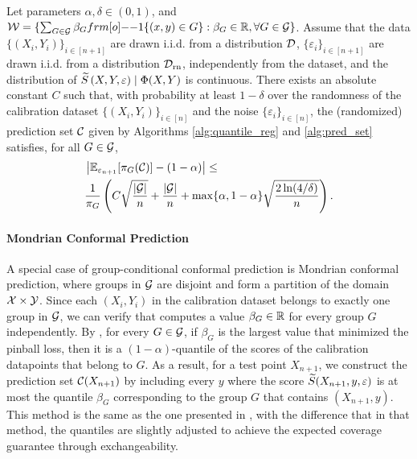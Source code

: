 \begin{corollary}
\label{cor: group-cond}
     Let parameters $\alpha,\delta \in (0,1)$, and $\calW = \{\sum_{G \in \calG} \beta_G \11\{(x,y) \in G\}: \beta_G \in \RR, \forall G \in \calG \}$. Assume that the data $\{(X_i,Y_i)\}_{i\in [n+1]}$ are drawn \mbox{i.i.d.} from a distribution ${\cal D}$, $\{\varepsilon_i\}_{i\in [n+1]}$ are drawn \mbox{i.i.d.} from a distribution ${\cal D}_{\text{rn}}$, independently from the dataset, and the distribution of ${\widetilde{S}}\left(X,Y, \varepsilon\right) \mid \Phi(X,Y)$ is continuous. There exists an absolute constant $C$ such that, with probability at least $1-\delta$ over the randomness of the calibration dataset $\{(X_i,Y_i)\}_{i\in [n]}$ and the noise $\{\varepsilon_i\}_{i \in [n]}$, the (randomized) prediction set ${\cal C}$ given by Algorithms \ref{alg:quantile_reg} and \ref{alg:pred_set} satisfies, for all $G \in {\cal G}$,
    \begin{align*}
    &\left|\mathbb{E}_{\varepsilon_{n+1}}[\pi_{G} ({\cal C})] -(1-\alpha)\right| \leq \\
    &{} 
    \frac{1}{\pi_G}\left( C \sqrt{\frac{|{\cal G}|}{n}} + \frac{|{\cal G}|}{n} +\max \{\alpha, 1-\alpha\}\sqrt{\frac{2\ln(4/\delta)}{n}}  \right).
    \end{align*}
\end{corollary}

\paragraph{Mondrian Conformal Prediction}
A special case of group-conditional conformal prediction is Mondrian conformal prediction, where groups in ${\cal G}$ are disjoint and form a partition of the domain ${\cal X} \times {\cal Y}$. Since each $(X_i, Y_i)$ in the calibration dataset belongs to exactly one group in ${\cal G}$, we can verify that  computes a value $\beta_G \in \mathbb{R}$ for every group $G$ independently. By , for every $G \in {\cal G}$, if $\beta_G$ is the largest value that minimized the pinball loss, then it is a $(1-\alpha)$-quantile of the scores of the calibration datapoints that belong to $G$. As a result, for a test point $X_{n+1}$, we construct the prediction set ${\cal C}(X_{n+1})$ by including every $y$ where the score ${\widetilde{S}}(X_{n+1},y,\varepsilon)$ is at most the quantile $\beta_G$ corresponding to the group $G$ that contains $(X_{n+1},y)$. This method is the same as the one presented in \cite{VLNG03}, with the difference that in that method, the quantiles are slightly adjusted to achieve the expected coverage guarantee through exchangeability. 

